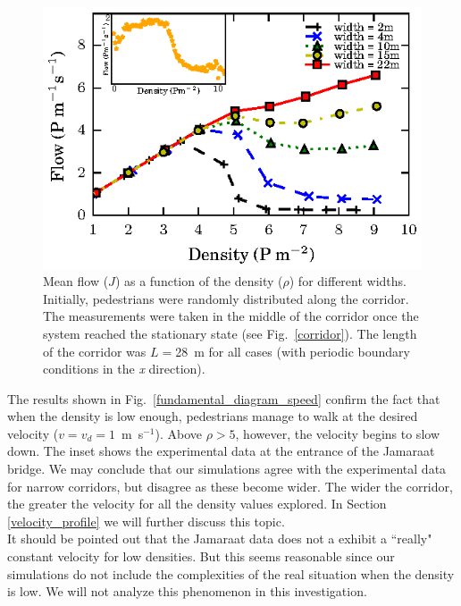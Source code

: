 \documentclass[preprint,12pt]{elsarticle}
\begin{document}
\begin{figure}[htbp!]
\centering
\includegraphics[width=0.7\columnwidth]
{./flow-density_vd1_multiple_widths.eps}
\caption{\label{fundamental_diagram_flow} Mean flow ($J$) as a function of the 
density ($\rho$) for different widths. Initially, pedestrians were randomly 
distributed along the corridor. The measurements were taken in the middle
of the corridor once the system reached the stationary state (see Fig.~\ref{corridor}). The length of the corridor 
was $L=$28~m for all cases (with periodic boundary conditions in the \textit{x} direction).}
\end{figure}

The results shown in Fig.~\ref{fundamental_diagram_speed} confirm the fact that when the density is low enough, pedestrians manage to walk at the desired velocity ($v=v_d=1$~m~s$^{-1}$). Above $\rho>5$, however, the velocity begins to slow down. The inset shows the experimental data at the entrance of the Jamaraat bridge. We may conclude that our simulations agree with the experimental data for narrow corridors, but disagree as these become wider. The wider the corridor, the greater the velocity for all the density values explored. In Section \ref{velocity_profile} we will further discuss this topic.\\

It should be pointed out that the Jamaraat data does not a exhibit a ``really" constant velocity for low densities. But this seems reasonable since our simulations do not include the complexities of the real situation when the density is low. We will not analyze this phenomenon in this investigation. \\
\end{document}
